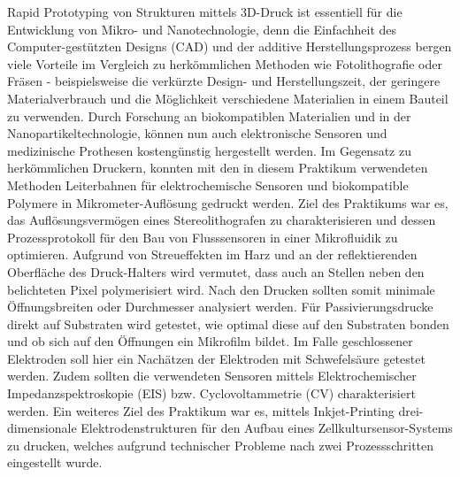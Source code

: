 Rapid Prototyping von Strukturen mittels 3D-Druck ist essentiell für die Entwicklung von Mikro- und Nanotechnologie, denn die Einfachheit des Computer-gestützten Designs (CAD) und der additive Herstellungsprozess bergen viele Vorteile im Vergleich zu herkömmlichen Methoden wie Fotolithografie oder Fräsen - beispielsweise die verkürzte Design- und Herstellungszeit, der geringere Materialverbrauch und die Möglichkeit verschiedene Materialien in einem Bauteil zu verwenden.\cite{Vaezi2012,Chu2014}
Durch Forschung an biokompatiblen Materialien und in der Nanopartikeltechnologie, können nun auch elektronische Sensoren und medizinische Prothesen kostengünstig hergestellt werden.\cite{SanchezRomaguera2008,Mohammed2017}
Im Gegensatz zu herkömmlichen Druckern, konnten mit den in diesem Praktikum verwendeten Methoden Leiterbahnen für elektrochemische Sensoren und biokompatible Polymere in Mikrometer-Auflösung gedruckt werden.\cite{Skript}
Ziel des Praktikums war es, das Auflösungsvermögen eines Stereolithografen zu charakterisieren und dessen Prozessprotokoll für den Bau von Flusssensoren in einer Mikrofluidik zu optimieren. Aufgrund von Streueffekten im Harz und an der reflektierenden Oberfläche des Druck-Halters wird vermutet, dass auch an Stellen neben den belichteten Pixel polymerisiert wird. Nach den Drucken sollten somit minimale Öffnungsbreiten oder Durchmesser analysiert werden.
Für Passivierungsdrucke direkt auf Substraten wird getestet, wie optimal diese auf den Substraten bonden und ob sich auf den Öffnungen ein Mikrofilm bildet. Im Falle geschlossener Elektroden soll hier ein Nachätzen der Elektroden mit Schwefelsäure getestet werden. Zudem sollten die verwendeten Sensoren mittels Elektrochemischer Impedanzspektroskopie (EIS) bzw. Cyclovoltammetrie (CV) charakterisiert werden. Ein weiteres Ziel des Praktikum war es, mittels Inkjet-Printing drei-dimensionale Elektrodenstrukturen für den Aufbau eines Zellkultursensor-Systems zu drucken, welches aufgrund technischer Probleme nach zwei Prozessschritten eingestellt wurde.